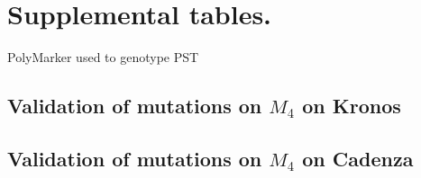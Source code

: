 
\chapter{Supplemental tables.}

\begin{table}

\centering
\caption{PolyMarker used to genotype PST}
\label{app:PolyMarkerPST}
\begin{localsize}{6}{7}

\end{localsize}
\end{table}

\label{app:PolyMarkerValidation}
\begin{sidewaystable}
\section{Validation of mutations on $M_{4}$ on Kronos}
\label{app:PolyMarkerM4ValidationKronos}

\begin{localsize}{6}{7}



\end{localsize}
\end{sidewaystable}

\begin{sidewaystable}

\section{Validation of mutations on $M_{4}$ on Cadenza}

\begin{localsize}{6}{7}

\label{app:PolyMarkerM4ValidationCadenza}

\end{localsize}
\end{sidewaystable}


\begin{sidewaystable}
\begin{localsize}{6}{7}


\end{localsize}
\end{sidewaystable}

\begin{sidewaystable}
\begin{localsize}{6}{7}


\end{localsize}
\end{sidewaystable}

